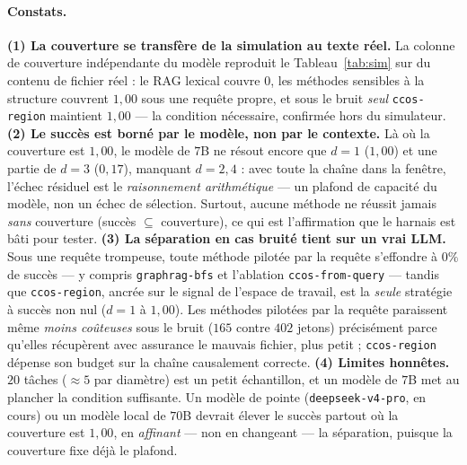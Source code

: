 \documentclass[11pt]{article}
\newcommand{\code}[1]{\texttt{#1}}
\begin{document}
\paragraph{Constats.}
\textbf{(1) La couverture se transfère de la simulation au texte réel.} La colonne de
couverture indépendante du modèle reproduit le Tableau~\ref{tab:sim} sur du contenu de
fichier réel : le RAG lexical couvre $0$, les méthodes sensibles à la structure couvrent
$1{,}00$ sous une requête propre, et sous le bruit \emph{seul} \code{ccos-region}
maintient $1{,}00$ --- la condition nécessaire, confirmée hors du simulateur.
\textbf{(2) Le succès est borné par le modèle, non par le contexte.} Là où la couverture
est $1{,}00$, le modèle de $7$B ne résout encore que $d{=}1$ ($1{,}00$) et une partie de
$d{=}3$ ($0{,}17$), manquant $d{=}2,4$ : avec toute la chaîne dans la fenêtre, l'échec
résiduel est le \emph{raisonnement arithmétique} --- un plafond de capacité du modèle,
non un échec de sélection. Surtout, aucune méthode ne réussit jamais \emph{sans}
couverture (succès $\subseteq$ couverture), ce qui est l'affirmation que le harnais est
bâti pour tester.
\textbf{(3) La séparation en cas bruité tient sur un vrai LLM.} Sous une requête
trompeuse, toute méthode pilotée par la requête s'effondre à $0\%$ de succès --- y
compris \code{graphrag-bfs} et l'ablation \code{ccos-from-query} --- tandis que
\code{ccos-region}, ancrée sur le signal de l'espace de travail, est la \emph{seule}
stratégie à succès non nul ($d{=}1$ à $1{,}00$). Les méthodes pilotées par la requête
paraissent même \emph{moins coûteuses} sous le bruit ($165$ contre $402$ jetons)
précisément parce qu'elles récupèrent avec assurance le mauvais fichier, plus petit ;
\code{ccos-region} dépense son budget sur la chaîne causalement correcte.
\textbf{(4) Limites honnêtes.} $20$ tâches ($\approx 5$ par diamètre) est un petit
échantillon, et un modèle de $7$B met au plancher la condition suffisante. Un modèle de
pointe (\code{deepseek-v4-pro}, en cours) ou un modèle local de $70$B devrait élever le
succès partout où la couverture est $1{,}00$, en \emph{affinant} --- non en changeant ---
la séparation, puisque la couverture fixe déjà le plafond.
\end{document}
